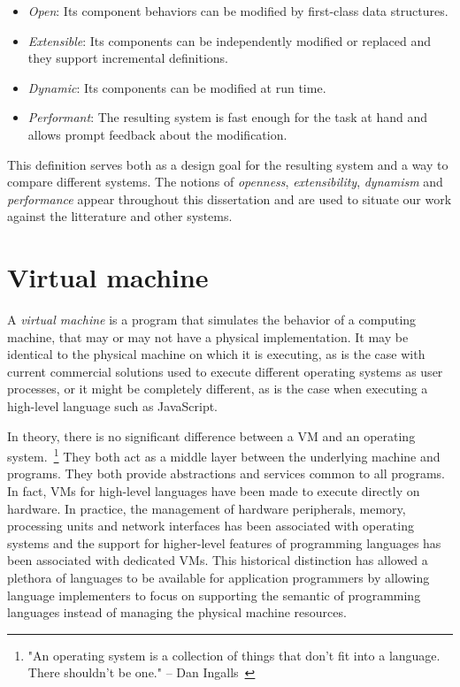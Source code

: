 \begin{itemize}
    \item \textit{Open}: Its component behaviors can be modified by first-class
        data structures. 
    \item \textit{Extensible}: Its components can be independently modified or
        replaced and they support incremental definitions. 
    \item \textit{Dynamic}: Its components can be modified at run time.
    \item \textit{Performant}: The resulting system is fast enough for the task
        at hand and allows prompt feedback about the modification.
\end{itemize}

This definition serves both as a design goal for the resulting system and a way
to compare different systems. The notions of \textit{openness},
\textit{extensibility}, \textit{dynamism} and \textit{performance} appear
throughout this dissertation and are used to situate our work against the
litterature and other systems.

\section{Virtual machine}

A \textit{virtual machine} is a program that simulates the behavior of a
computing machine, that may or may not have a physical implementation. It may
be identical to the physical machine on which it is executing, as is the case
with current commercial solutions used to execute different operating systems
as user processes, or it might be completely different, as is the case when
executing a high-level language such as JavaScript.  

In theory, there is no significant difference between a VM and
an operating system.~\footnote{"An operating system is a collection of
things that don't fit into a language. There shouldn't be one." -- Dan
Ingalls~\cite{Ingalls1981}} They both act as a middle layer between the
underlying machine and programs. They both provide abstractions and
services common to all programs. In fact, VMs for high-level
languages have been made to execute directly on hardware. In practice, the
management of hardware peripherals, memory, processing units and network
interfaces has been associated with operating systems and the support for
higher-level features of programming languages has been associated with
dedicated VMs. This historical distinction has allowed a plethora
of languages to be available for application programmers by allowing language
implementers to focus on supporting the semantic of programming languages
instead of managing the physical machine resources.

